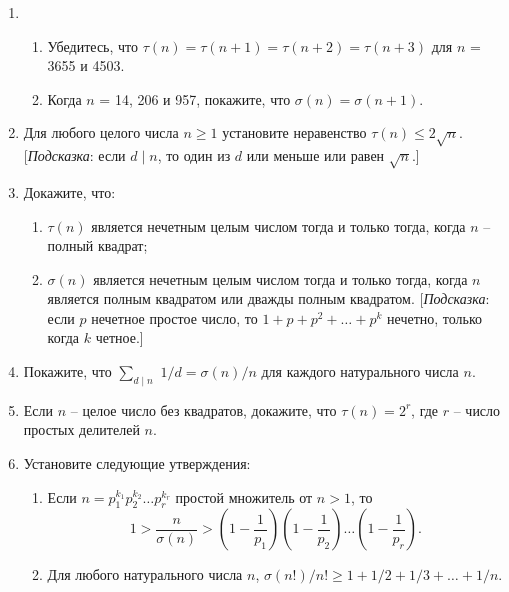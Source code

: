 \documentclass[11pt]{article}
\begin{document}
\begin{enumerate}
		\item
		\begin{enumerate} 
			\item Убедитесь, что $\tau(n) = \tau(n+1) = \tau(n+2) = \tau(n+3)$ для $n$ = 3655 и 4503.
			\item Когда $n$ = 14, 206 и 957, покажите, что $\sigma(n) = \sigma(n+1)$.
		\end{enumerate}
		\item Для любого целого числа $n \ge 1$ установите неравенство $\tau(n)\le 2\sqrt{n}$. [{\itshape Подсказка}: если
		$d\mid n$, то один из $d$ или меньше или равен $\sqrt{n}$.]
		\item Докажите, что:
		\begin{enumerate} 
			\item $\tau(n)$ является нечетным целым числом тогда и только тогда, когда $n$ -- полный квадрат;
			\item $\sigma(n)$ является нечетным целым числом тогда и только тогда, когда $n$ является полным квадратом или дважды полным квадратом. [{\itshape Подсказка}: если $p$ нечетное простое число, то $1+p+p^{2}+\ldots+p^{k}$ нечетно, только когда $k$ четное.]
		\end{enumerate}
		\item Покажите, что $\sum_{d\mid n}$ $1/d=\sigma(n)/n$ для каждого натурального числа $n$.
		\item Если $n$ -- целое число без квадратов, докажите, что $\tau(n) = 2^{r}$, где $r$ -- число простых делителей $n$.
		\item Установите следующие утверждения: 
		\begin{enumerate} 
			\item Если $n = p_{1}^{k_{1}}p_{2}^{k_{2}}\ldots p_{r}^{k_{r}}$ простой множитель от $n > 1$, то
			\[1 > \frac{n}{\sigma(n)} > \left (1 - \frac{1}{p_{1}}\right)\left (1 - \frac{1}{p_{2}}\right)\ldots \left (1 - \frac{1}{p_{r}}\right).\]
			\item Для любого натурального числа $n$,  $\sigma(n!)/n!\ge1+1/2+1/3+\ldots+1/n.$
			

\end{enumerate}
\end{enumerate}
\end{document}
